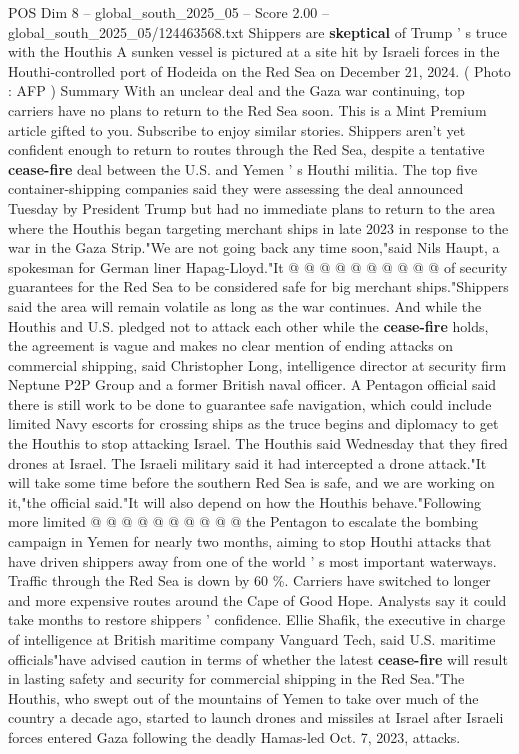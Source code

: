 \begin{textsample}{POS Dim 8 – global\_south\_2025\_05 – Score 2.00 – global\_south\_2025\_05/124463568.txt}  \label{ex:f8_pos_448}
Shippers are \textbf{skeptical} of Trump ' s truce with the Houthis A sunken vessel is pictured at a site hit by Israeli forces in the Houthi-controlled port of Hodeida on the Red Sea on December 21, 2024. ( Photo : AFP ) Summary With an unclear deal and the Gaza war continuing, top carriers have no plans to return to the Red Sea soon.
This is a Mint Premium article gifted to you.
Subscribe to enjoy similar stories.
Shippers aren't yet confident enough to return to routes through the Red Sea, despite a tentative \textbf{cease-fire} deal between the U.S. and Yemen ' s Houthi militia.
The top five container-shipping companies said they were assessing the deal announced Tuesday by President Trump but had no immediate plans to return to the area where the Houthis began targeting merchant ships in late 2023 in response to the war in the Gaza Strip."We are not going back any time soon,"said Nils Haupt, a spokesman for German liner Hapag-Lloyd."It @ @ @ @ @ @ @ @ @ @ of security guarantees for the Red Sea to be considered safe for big merchant ships."Shippers said the area will remain volatile as long as the war continues.
And while the Houthis and U.S. pledged not to attack each other while the \textbf{cease-fire} holds, the agreement is vague and makes no clear mention of ending attacks on commercial shipping, said Christopher Long, intelligence director at security firm Neptune P2P Group and a former British naval officer.
A Pentagon official said there is still work to be done to guarantee safe navigation, which could include limited Navy escorts for crossing ships as the truce begins and diplomacy to get the Houthis to stop attacking Israel.
The Houthis said Wednesday that they fired drones at Israel.
The Israeli military said it had intercepted a drone attack."It will take some time before the southern Red Sea is safe, and we are working on it,"the official said."It will also depend on how the Houthis behave."Following more limited @ @ @ @ @ @ @ @ @ @ the Pentagon to escalate the bombing campaign in Yemen for nearly two months, aiming to stop Houthi attacks that have driven shippers away from one of the world ' s most important waterways.
Traffic through the Red Sea is down by 60 \%.
Carriers have switched to longer and more expensive routes around the Cape of Good Hope.
Analysts say it could take months to restore shippers ' confidence.
Ellie Shafik, the executive in charge of intelligence at British maritime company Vanguard Tech, said U.S. maritime officials"have advised caution in terms of whether the latest \textbf{cease-fire} will result in lasting safety and security for commercial shipping in the Red Sea."The Houthis, who swept out of the mountains of Yemen to take over much of the country a decade ago, started to launch drones and missiles at Israel after Israeli forces entered Gaza following the deadly Hamas-led Oct. 7, 2023, attacks.

\end{textsample}
